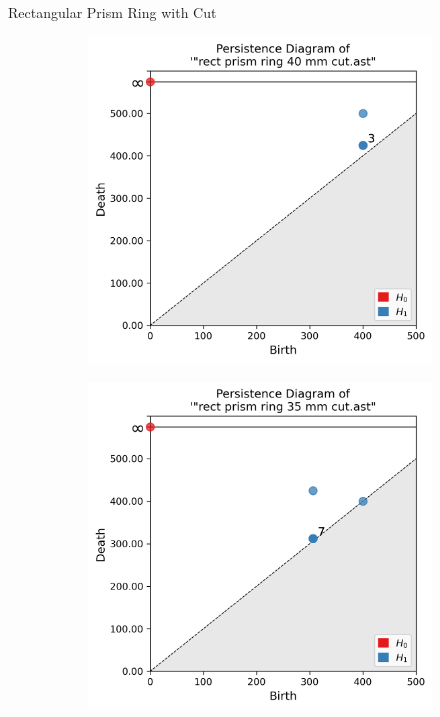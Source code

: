 \documentclass[xcolor=dvipsnames, aspectratio=169]{beamer}
\begin{document}
\begin{frame}{Rectangular Prism Ring with Cut}
\begin{figure}
\centering
\begin{subfigure}[b]{0.15\textwidth}
\includegraphics[width=\linewidth]{Final Run, (rect prism ring 40 mm cut) persdia.png}
\end{subfigure}
\begin{subfigure}[b]{0.15\textwidth}
\includegraphics[width=\linewidth]{Final Run, (rect prism ring 35 mm cut) persdia.png} 

\end{subfigure}
\end{figure}
\end{frame}
\end{document}
